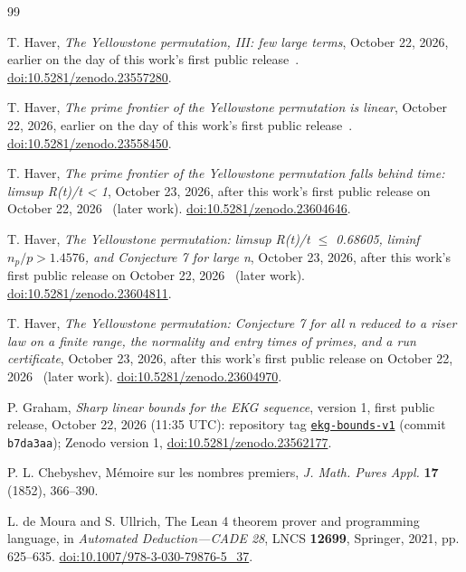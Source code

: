 \documentclass[11pt]{article}
\theoremstyle{definition}
\theoremstyle{remark}
\begin{document}
\begin{thebibliography}{99}

T. Haver, \emph{The Yellowstone permutation, III: few large terms}, October 22, 2026, earlier on
the day of this work's first public release~\cite{v1}.
\href{https://doi.org/10.5281/zenodo.23557280}{doi:10.5281/zenodo.23557280}.

T. Haver, \emph{The prime frontier of the Yellowstone permutation is linear}, October 22, 2026, earlier on
the day of this work's first public release~\cite{v1}.
\href{https://doi.org/10.5281/zenodo.23558450}{doi:10.5281/zenodo.23558450}.

T. Haver, \emph{The prime frontier of the Yellowstone permutation falls behind time: limsup R(t)/t < 1}, October 23, 2026, after this work's
first public release on October 22, 2026~\cite{v1} (later work).
\href{https://doi.org/10.5281/zenodo.23604646}{doi:10.5281/zenodo.23604646}.

T. Haver, \emph{The Yellowstone permutation: limsup R(t)/t $\leq$ 0.68605, liminf $n_p/p>1.4576$, and Conjecture 7 for large n}, October 23, 2026, after this work's
first public release on October 22, 2026~\cite{v1} (later work).
\href{https://doi.org/10.5281/zenodo.23604811}{doi:10.5281/zenodo.23604811}.

T. Haver, \emph{The Yellowstone permutation: Conjecture 7 for all n reduced to a riser law on a finite range, the normality and entry times of primes, and a run certificate}, October 23, 2026, after this work's
first public release on October 22, 2026~\cite{v1} (later work).
\href{https://doi.org/10.5281/zenodo.23604970}{doi:10.5281/zenodo.23604970}.

P. Graham, \emph{Sharp linear bounds for the EKG sequence}, version 1, first
public release, October 22, 2026 (11:35 UTC): repository tag
\href{https://github.com/6/clank-lab/tree/ekg-bounds-v1/results/ekg-bounds}{\texttt{ekg-bounds-v1}}
(commit \texttt{b7da3aa});
Zenodo version 1, \href{https://doi.org/10.5281/zenodo.23562177}{doi:10.5281/zenodo.23562177}.


P. L. Chebyshev, M\'emoire sur les nombres premiers,
\emph{J. Math. Pures Appl.} \textbf{17} (1852), 366--390.

L. de Moura and S. Ullrich, The Lean 4 theorem prover and programming
language, in \emph{Automated Deduction---CADE 28}, LNCS \textbf{12699},
Springer, 2021, pp. 625--635.
\href{https://doi.org/10.1007/978-3-030-79876-5_37}{doi:10.1007/978-3-030-79876-5\_37}.


\end{thebibliography}
\end{document}
